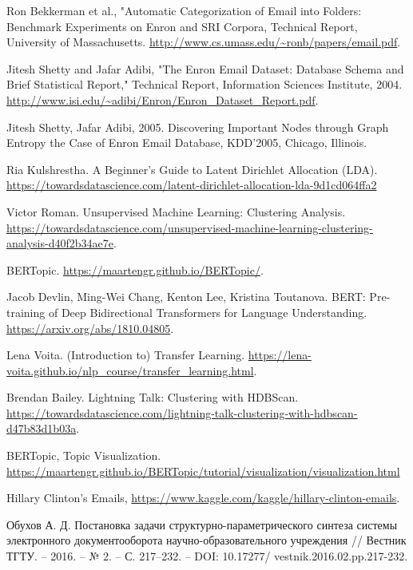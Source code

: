 

\begin{thebibliography}{3}

Ron Bekkerman et al., "Automatic Categorization of Email into Folders:
Benchmark Experiments on Enron and SRI Corpora, Technical Report,
University of Massachusetts. \url{http://www.cs.umass.edu/~ronb/papers/email.pdf}.

Jitesh Shetty and Jafar Adibi, "The Enron Email Dataset: Database Schema and Brief Statistical Report," Technical Report, Information Sciences Institute, 2004. \url{http://www.isi.edu/~adibi/Enron/Enron_Dataset_Report.pdf}.

Jitesh Shetty, Jafar Adibi, 2005. Discovering Important Nodes
through Graph Entropy the Case of Enron Email Database,
KDD’2005, Chicago, Illinois.

Ria Kulshrestha. A Beginner’s Guide to Latent Dirichlet Allocation (LDA). \url{https://towardsdatascience.com/latent-dirichlet-allocation-lda-9d1cd064ffa2}

Victor Roman. Unsupervised Machine Learning: Clustering Analysis. \url{https://towardsdatascience.com/unsupervised-machine-learning-clustering-analysis-d40f2b34ae7e}.

BERTopic. \url{https://maartengr.github.io/BERTopic/}.

Jacob Devlin, Ming-Wei Chang, Kenton Lee, Kristina Toutanova. BERT: Pre-training of Deep Bidirectional Transformers for Language Understanding. 
\url{https://arxiv.org/abs/1810.04805}.


Lena Voita. 
(Introduction to) Transfer Learning. \url{https://lena-voita.github.io/nlp_course/transfer_learning.html}.

Brendan Bailey. Lightning Talk: Clustering with HDBScan. \url{https://towardsdatascience.com/lightning-talk-clustering-with-hdbscan-d47b83d1b03a}.

BERTopic, Topic Visualization. \url{https://maartengr.github.io/BERTopic/tutorial/visualization/visualization.html}


Hillary Clinton's Emails,
\url{https://www.kaggle.com/kaggle/hillary-clinton-emails}.

Обухов А. Д. Постановка задачи структурно-параметрического синтеза системы
электронного документооборота научно-образовательного учреждения // Вестник ТГТУ. –
2016. – № 2. – С. 217–232. – DOI: 10.17277/
vestnik.2016.02.pp.217-232.


\end{thebibliography}
